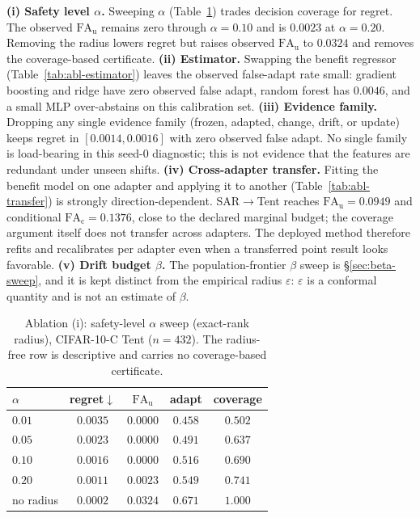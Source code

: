 \textbf{(i) Safety level $\alpha$.} Sweeping $\alpha$ (Table~\ref{tab:abl-alpha}) trades decision
coverage for regret. The observed $\mathrm{FA}_{\mathrm u}$ remains zero through $\alpha=0.10$ and
is $0.0023$ at $\alpha=0.20$. Removing the radius lowers regret but raises observed
$\mathrm{FA}_{\mathrm u}$ to $0.0324$ and removes the coverage-based certificate.
\textbf{(ii) Estimator.} Swapping the benefit regressor (Table~\ref{tab:abl-estimator}) leaves the
observed false-adapt rate small: gradient boosting and ridge have zero observed false adapt, random
forest has $0.0046$, and a small MLP over-abstains on this calibration set.
\textbf{(iii) Evidence family.} Dropping any single evidence family (frozen, adapted, change, drift,
or update) keeps regret in $[0.0014,0.0016]$ with zero observed false adapt. No single family is
load-bearing in this seed-0 diagnostic; this is not evidence that the features are redundant under
unseen shifts.
\textbf{(iv) Cross-adapter transfer.} Fitting the benefit model on one adapter and applying it to
another (Table~\ref{tab:abl-transfer}) is strongly direction-dependent. SAR$\to$Tent reaches
$\mathrm{FA}_{\mathrm u}=0.0949$ and conditional $\mathrm{FA}_{\mathrm c}=0.1376$, close to the
declared marginal budget; the coverage argument itself does not transfer across adapters. The
deployed method therefore refits and recalibrates per adapter even when a transferred point result
looks favorable.
\textbf{(v) Drift budget $\beta$.} The population-frontier $\beta$ sweep is
\S\ref{sec:beta-sweep}, and it is kept distinct from the empirical radius $\varepsilon$:
$\varepsilon$ is a conformal quantity and is not an estimate of $\beta$.

\begin{table}[t]\centering\footnotesize
\caption{Ablation (i): safety-level $\alpha$ sweep (exact-rank radius), CIFAR-10-C Tent ($n{=}432$).
The radius-free row is descriptive and carries no coverage-based certificate.}
\label{tab:abl-alpha}
\begin{tabular}{lcccc}
\toprule
$\alpha$ & regret$\downarrow$ & $\mathrm{FA}_{\mathrm u}$ & adapt & coverage \\
\midrule
$0.01$ & $0.0035$ & $0.0000$ & $0.458$ & $0.502$ \\
$0.05$ & $0.0023$ & $0.0000$ & $0.491$ & $0.637$ \\
$0.10$ & $0.0016$ & $0.0000$ & $0.516$ & $0.690$ \\
$0.20$ & $0.0011$ & $0.0023$ & $0.549$ & $0.741$ \\
no radius & $0.0002$ & $0.0324$ & $0.671$ & $1.000$ \\
\bottomrule
\end{tabular}
\end{table}

